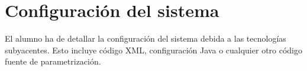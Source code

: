 \section{\forlnameref Configuración del sistema}
\label{sec:systemConfiguration}

\begin{shaded}
El alumno ha de detallar la configuración del sistema debida a las tecnologías subyacentes. Esto incluye código \ac{XML}, configuración Java o cualquier otro código fuente de parametrización. 


\end{shaded}